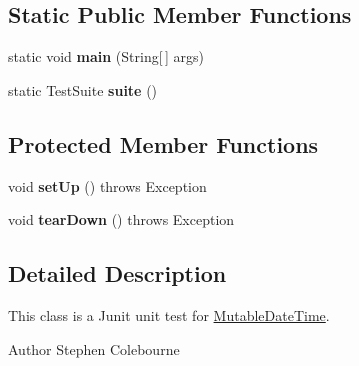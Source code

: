 \subsection*{Static Public Member Functions}
\begin{DoxyCompactItemize}
\item 
\hypertarget{classorg_1_1joda_1_1time_1_1_test_mutable_date_time___constructors_a49947755326f766f5d87727b5c03f2d1}{static void {\bfseries main} (String\mbox{[}$\,$\mbox{]} args)}\label{classorg_1_1joda_1_1time_1_1_test_mutable_date_time___constructors_a49947755326f766f5d87727b5c03f2d1}

\item 
\hypertarget{classorg_1_1joda_1_1time_1_1_test_mutable_date_time___constructors_a27afc2f79c3a1f3de4286932d2f13988}{static Test\-Suite {\bfseries suite} ()}\label{classorg_1_1joda_1_1time_1_1_test_mutable_date_time___constructors_a27afc2f79c3a1f3de4286932d2f13988}

\end{DoxyCompactItemize}
\subsection*{Protected Member Functions}
\begin{DoxyCompactItemize}
\item 
\hypertarget{classorg_1_1joda_1_1time_1_1_test_mutable_date_time___constructors_a15f2dc11630e6dde379867d1a3db5731}{void {\bfseries set\-Up} ()  throws Exception }\label{classorg_1_1joda_1_1time_1_1_test_mutable_date_time___constructors_a15f2dc11630e6dde379867d1a3db5731}

\item 
\hypertarget{classorg_1_1joda_1_1time_1_1_test_mutable_date_time___constructors_a5a38e849fecea92aeeacc22130e3f63c}{void {\bfseries tear\-Down} ()  throws Exception }\label{classorg_1_1joda_1_1time_1_1_test_mutable_date_time___constructors_a5a38e849fecea92aeeacc22130e3f63c}

\end{DoxyCompactItemize}


\subsection{Detailed Description}
This class is a Junit unit test for \hyperlink{classorg_1_1joda_1_1time_1_1_mutable_date_time}{Mutable\-Date\-Time}.

\begin{DoxyAuthor}{Author}
Stephen Colebourne 
\end{DoxyAuthor}


